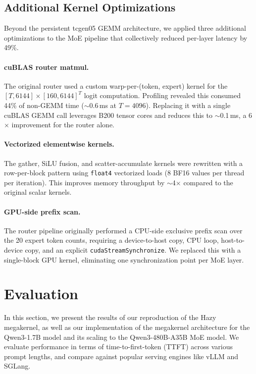 \documentclass[sigplan,screen]{acmart}
\begin{document}
\subsection{Additional Kernel Optimizations}
\label{sec:addopt}

Beyond the persistent tcgen05 GEMM architecture, we applied three additional optimizations to the MoE pipeline that collectively reduced per-layer latency by 49\%.

\paragraph{cuBLAS router matmul.} The original router used a custom warp-per-(token, expert) kernel for the \newline $[T, 6144] \times [160, 6144]^T$ logit computation. Profiling revealed this consumed 44\% of non-GEMM time ($\sim$0.6\,ms at $T{=}4096$). Replacing it with a single cuBLAS GEMM call leverages B200 tensor cores and reduces this to $\sim$0.1\,ms, a 6$\times$ improvement for the router alone.

\paragraph{Vectorized elementwise kernels.} The gather, SiLU fusion, and scatter-accumulate kernels were rewritten with a row-per-block pattern using \texttt{float4} vectorized loads (8 BF16 values per thread per iteration). This improves memory throughput by $\sim$4$\times$ compared to the original scalar kernels.

\paragraph{GPU-side prefix scan.} The router pipeline originally performed a CPU-side exclusive prefix scan over the 20 expert token counts, requiring a device-to-host copy, CPU loop, host-to-device copy, and an explicit \texttt{cudaStreamSynchronize}. We replaced this with a single-block GPU kernel, eliminating one synchronization point per MoE layer.


\section{Evaluation}
In this section, we present the results of our reproduction of the Hazy megakernel, as well as our implementation of the megakernel architecture for the Qwen3-1.7B model and its scaling to the Qwen3-480B-A35B MoE model. We evaluate performance in terms of time-to-first-token (TTFT) across various prompt lengths, and compare against popular serving engines like vLLM and SGLang.
\end{document}
